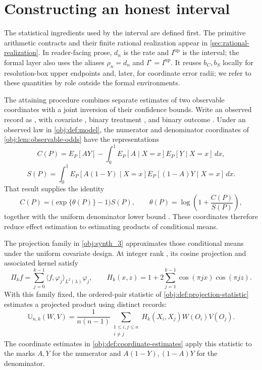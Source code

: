 \section{Constructing an honest interval}

The statistical ingredients used by the interval are defined first. The primitive arithmetic contracts and their finite rational realization appear in \cref{sec:rational-realization}. In reader-facing prose, \(d_n\) is the rate and \(I^{\mathrm{up}}\) is the interval; the formal layer also uses the aliases \(\rho_n=d_n\) and \(I^\star=I^{\mathrm{up}}\). It reuses \(b_C,b_S\) locally for resolution-box upper endpoints and, later, for coordinate error radii; we refer to these quantities by role outside the formal environments.

The attaining procedure combines separate estimates of two observable coordinates with a joint inversion of their confidence bounds. Write an observed record as , with covariate , binary treatment , and binary outcome . Under an observed law  in \cref{obj:def:model}, the numerator and denominator coordinates of \cref{obj:lem:observable-odds} have the representations
\[
C(P)
=
E_P[AY]
-
\int_0^1
E_P[A\mid X=x]E_P[Y\mid X=x]\,dx,
\]
\[
S(P)
=
\int_0^1
E_P[A(1-Y)\mid X=x]
E_P[(1-A)Y\mid X=x]\,dx.
\]
That result supplies the identity
\[
C(P)=\bigl(\exp\{\theta(P)\}-1\bigr)S(P),
\qquad
\theta(P)=\log\!\left(1+\frac{C(P)}{S(P)}\right),
\]
together with the uniform denominator lower bound . These coordinates therefore reduce effect estimation to estimating products of conditional means.

The projection family in \cref{obj:synth_3} approximates those conditional means under the uniform covariate design. At integer rank , its cosine projection and associated kernel satisfy
\[
\Pi_k f
=
\sum_{j=0}^{k-1}
\langle f,\varphi_j\rangle_{L^2(\lambda)}\varphi_j,
\qquad
H_k(x,z)
=
1+2\sum_{j=1}^{k-1}\cos(\pi jx)\cos(\pi jz).
\]
With this family fixed, the ordered-pair statistic of \cref{obj:def:projection-statistic} estimates a projected product using distinct records:
\[
\mathbb U_{n,k}(W,V)
=
\frac{1}{n(n-1)}
\sum_{\substack{1\le i,j\le n\\i\ne j}}
H_k(X_i,X_j)W(O_i)V(O_j).
\]
The coordinate estimates in \cref{obj:def:coordinate-estimates} apply this statistic to the marks \(A,Y\) for the numerator and \(A(1-Y),(1-A)Y\) for the denominator.


